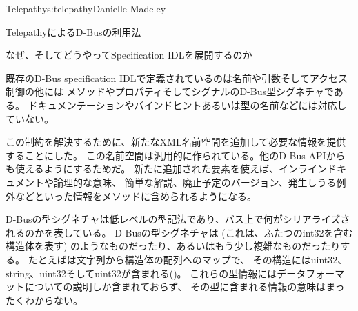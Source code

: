 \begin{aosachapter}{Telepathy}{s:telepathy}{Danielle Madeley}
\begin{aosasect1}{TelepathyによるD-Busの利用法}
\begin{aosabox}{なぜ、そしてどうやってSpecification IDLを展開するのか}

既存のD-Bus specification IDLで定義されているのは名前や引数そしてアクセス制御の他には
メソッドやプロパティそしてシグナルのD-Bus型シグネチャである。
ドキュメンテーションやバインドヒントあるいは型の名前などには対応していない。

この制約を解決するために、新たなXML名前空間を追加して必要な情報を提供することにした。
この名前空間は汎用的に作られている。他のD-Bus APIからも使えるようにするためだ。
新たに追加された要素を使えば、インラインドキュメントや論理的な意味、
簡単な解説、廃止予定のバージョン、発生しうる例外などといった情報をメソッドに含められるようになる。

D-Busの型シグネチャは低レベルの型記法であり、バス上で何がシリアライズされるのかを表している。
D-Busの型シグネチャは (これは、ふたつのint32を含む構造体を表す)
のようなものだったり、あるいはもう少し複雑なものだったりする。
たとえばは文字列から構造体の配列へのマップで、
その構造にはuint32、string、uint32そしてuint32が含まれる()。
これらの型情報にはデータフォーマットについての説明しか含まれておらず、
その型に含まれる情報の意味はまったくわからない。


\end{aosabox}
\end{aosasect1}
\end{aosachapter}
